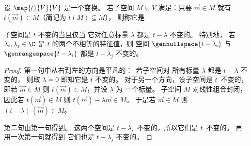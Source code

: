 \begin{definition} \label{def:invariant}
设 \( \map{t}{V}{V} \) 是一个变换。
若子空间 \( M\subseteq V \) 满足：只要 \( \vec{m}\in M \) 就有
\( t(\vec{m})\in M \)（简记为 \( t(M)\subseteq M \)），
则称它是 %
\end{definition}

\begin{lemma} \label{le:tInvIfftMinLambdaInv}
子空间是 \( t \) 不变的当且仅当
它对任意标量 \( \lambda \) 都是 \( t-\lambda \) 不变的。
特别地，
若 \( \lambda_i,\lambda_j\in\C \) 是
\( t \) 的两个不相等的特征值，则
空间 \( \gennullspace{t-\lambda_i} \)
与 \( \genrangespace{t-\lambda_i} \)
都是 \( t-\lambda_j \) 不变的。
\end{lemma}

\begin{proof}
第一句中从右到左的方向是平凡的：~若子空间对
所有标量 $\lambda$ 都是 $t-\lambda$ 不变的，
则取 $\lambda=0$
即知它是 $t$ 不变的。
对于另一个方向，设子空间是 $t$~不变的，
即若 $\vec{m}\in M$ 则 $t(\vec{m})\in M$，并设 $\lambda$ 为
一个标量。
子空间 $M$ 对线性组合封闭，因此若
$t(\vec{m})\in M$ 则 $t(\vec{m})-\lambda\vec{m}\in M$。
于是若 $\vec{m}\in M$ 则 $(t-\lambda)\,(\vec{m})\in M$。

第二句由第一句得到。
这两个空间是 $t-\lambda_i$~不变的，所以它们是 \( t \)~不变的。
再用一次第一句就得到
它们也是 \( t-\lambda_j \) 不变的。
\end{proof}

